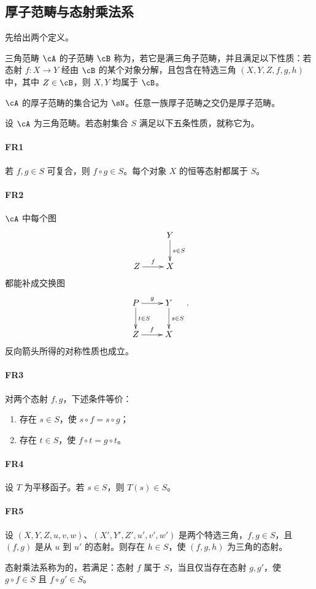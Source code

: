 \subsection{厚子范畴与态射乘法系}\label{VIII:2-1}
先给出两个定义。
\begin{definition}\label{VIII:2-1-1}
三角范畴 $\cA$ 的子范畴 $\cB$ 称为，若它是满三角子范畴，并且满足以下性质：若态射 $f:X\to Y$ 经由 $\cB$ 的某个对象分解，且包含在特选三角 $(X,Y,Z,f,g,h)$ 中，其中 $Z\in\cB$，则 $X,Y$ 均属于 $\cB$。
\end{definition}
$\cA$ 的厚子范畴的集合记为 $\sN$。任意一族厚子范畴之交仍是厚子范畴。
\begin{definition}
设 $\cA$ 为三角范畴。若态射集合 $S$ 满足以下五条性质，就称它为。
\paragraph{FR1}\hypertarget{VIII:FR1}{}
若 $f,g\in S$ 可复合，则 $f\circ g\in S$。每个对象 $X$ 的恒等态射都属于 $S$。
\paragraph{FR2}\hypertarget{VIII:FR2}{}
$\cA$ 中每个图
\[\xymatrix{&Y\ar[d]^-{s\in S}\\Z\ar[r]^-f&X}\]
都能补成交换图
\[\xymatrix{P\ar[r]^-g\ar[d]^-{t\in S}&Y\ar[d]^-{s\in S}\\Z\ar[r]^-f&X}.\]
反向箭头所得的对称性质也成立。
\paragraph{FR3}\hypertarget{VIII:FR3}{}
对两个态射 $f,g$，下述条件等价：
\begin{enumerate}[\indent i)]
\item 存在 $s\in S$，使 $s\circ f=s\circ g$；
\item 存在 $t\in S$，使 $f\circ t=g\circ t$。
\end{enumerate}
\paragraph{FR4}\hypertarget{VIII:FR4}{}
设 $T$ 为平移函子。若 $s\in S$，则 $T(s)\in S$。
\paragraph{FR5}\hypertarget{VIII:FR5}{}
设 $(X,Y,Z,u,v,w)$、$(X',Y',Z',u',v',w')$ 是两个特选三角，$f,g\in S$，且 $(f,g)$ 是从 $u$ 到 $u'$ 的态射。则存在 $h\in S$，使 $(f,g,h)$ 为三角的态射。
\end{definition}
态射乘法系称为的，若满足：态射 $f$ 属于 $S$，当且仅当存在态射 $g,g'$，使 $g\circ f\in S$ 且 $f\circ g'\in S$。

